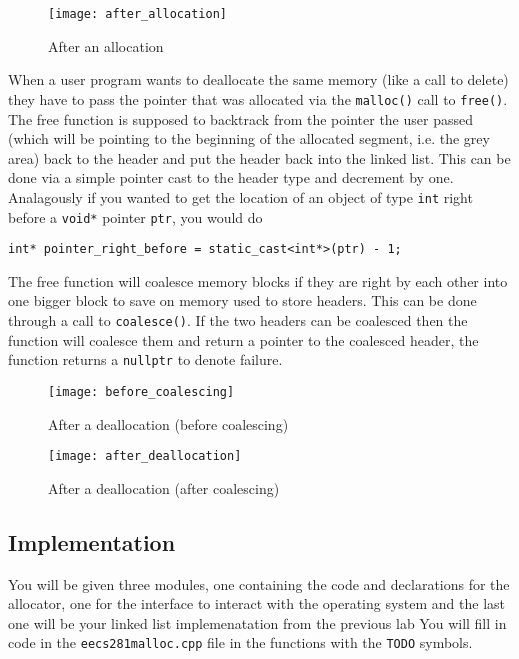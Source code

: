 \documentclass{article}
\begin{document}
\begin{figure}[!htb]
\centering
\texttt{[image: after\_allocation]}
\caption{After an allocation}
\end{figure}

When a user program wants to deallocate the same memory (like a call to
delete) they have to pass the pointer that was allocated via the
\texttt{malloc()} call to \texttt{free()}.  The free function is supposed to
backtrack from the pointer the user passed (which will be pointing to the
beginning of the allocated segment, i.e.  the grey area) back to the header
and put the header back into the linked list.  This can be done via a simple
pointer cast to the header type and decrement by one.  Analagously if you
wanted to get the location of an object of type \texttt{int} right before a
\texttt{void*} pointer \texttt{ptr}, you would do

\begin{lstlisting}
int* pointer_right_before = static_cast<int*>(ptr) - 1;
\end{lstlisting}

The free function will coalesce memory blocks if they are right by each other
into one bigger block to save on memory used to store headers.  This can be
done through a call to \texttt{coalesce()}.  If the two headers can be
coalesced then the function will coalesce them and return a pointer to the
coalesced header, the function returns a \texttt{nullptr} to denote failure.

\begin{figure}[!htb]
\centering
\texttt{[image: before\_coalescing]}
\caption{After a deallocation (before coalescing)}
\end{figure}

\begin{figure}[!htb]
\centering
\texttt{[image: after\_deallocation]}
\caption{After a deallocation (after coalescing)}
\end{figure}

\newpage
\subsection{Implementation}
You will be given three modules, one containing the code and declarations for
the allocator, one for the interface to interact with the operating system and
the last one will be your linked list implemenatation from the previous lab
You will fill in code in the \texttt{eecs281malloc.cpp} file in the functions
with the \texttt{TODO} symbols.
\end{document}

